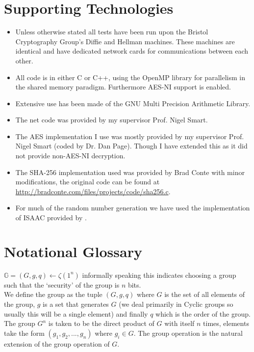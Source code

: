 \documentclass[ %
                    author={Nicholas Tutte},
                supervisor={Prof. Nigel Smart},
                    degree={MEng},
                     title={Secure Two Party Computation},
                  subtitle={A practical comparison of recent protocols},
                      type={Research - GG1K},
                      year={2015} ]{dissertation}
\begin{document}
		\section*{Supporting Technologies}
			\begin{itemize}
					\item Unless otherwise stated all tests have been run upon the Bristol Cryptography Group's Diffie and Hellman machines. These machines are identical and have dedicated network cards for communications between each other.
					\item All code is in either C or C++, using the OpenMP library for parallelism in the shared memory paradigm. Furthermore AES-NI support is enabled.
					\item Extensive use has been made of the GNU Multi Precision Arithmetic Library.
					\item The net code was provided by my supervisor Prof. Nigel Smart.
					\item The AES implementation I use was mostly provided by my supervisor Prof. Nigel Smart (coded by Dr. Dan Page). Though I have extended this as it did not provide non-AES-NI decryption.
					\item The SHA-256 implementation used was provided by Brad Conte with minor modifications, the original code can be found at \url{http://bradconte.com/files/projects/code/sha256.c}.
					\item For much of the random number generation we have used the implementation of ISAAC provided by \cite{ISAAC_Implementation}.
			\end{itemize}

		\section*{Notational Glossary}
			$\mathbb{G} = (G, g, q) \leftarrow \zeta(1^n)$ informally speaking this indicates choosing a group such that the `security' of the group is $n$ bits.\\

			We define the group as the tuple $(G, g, q)$ where $G$ is the set of all elements of the group, $g$ is a set that generates $G$ (we deal primarily in Cyclic groups so usually this will be a single element) and finally $q$ which is the order of the group.\\

			The group $G^n$ is taken to be the direct product of $G$ with itself $n$ times, elements take the form $(g_1, g_2, ..., g_n)$ where $g_i \in G$. The group operation is the natural extension of the group operation of $G$.\\
\end{document}
